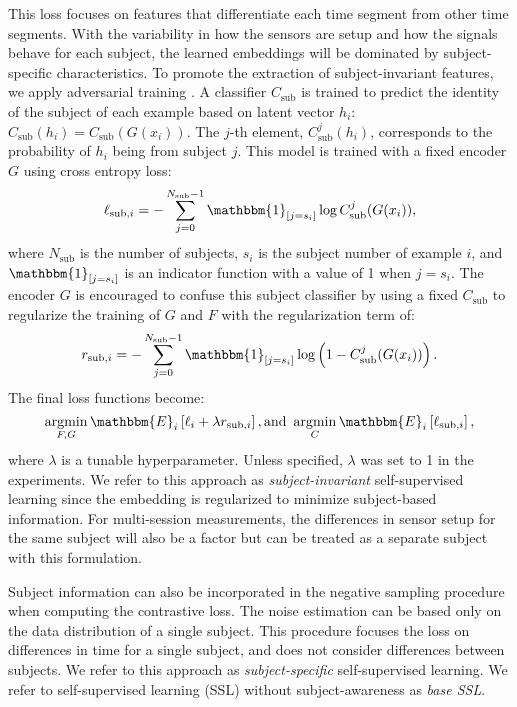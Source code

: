 \documentclass{article}
\DeclareMathOperator*{\argmin}{argmin}
\begin{document}
This loss focuses on features that differentiate each time segment from other
time segments. With the variability in how the sensors are setup and how the
signals behave for each subject, the learned embeddings will be dominated by
subject-specific characteristics. To promote the extraction of subject-invariant
features, we apply adversarial training \cite{goodfellow_generative_2014,
xie_controllable_2017}. A classifier $C_\textrm{sub}$ is trained to predict the
identity of the subject of each example based on latent vector $h_i$:
$C_\textrm{sub}(h_i) = C_\textrm{sub}(G(x_i))$. The $j$-th element,
$C^j_\textrm{sub}(h_i)$, corresponds to the probability of $h_i$ being from
subject $j$. This model is trained with a fixed encoder $G$ using cross entropy
loss:
\begin{equation}
  \ell_{\textrm{sub},i} = -\sum_{j=0}^{N_\textrm{sub}-1} \mathbbm{1}_{[j = s_i]} \log C^j_\textrm{sub}(G(x_i)),
\end{equation}
where $N_\textrm{sub}$ is the number of subjects, $s_i$ is the subject number of
example $i$, and $\mathbbm{1}_{[j = s_i]}$ is an indicator function with a value
of 1 when $j = s_i$. The encoder $G$ is encouraged to confuse this subject
classifier by using a fixed $C_\textrm{sub}$ to regularize the training of $G$
and $F$ with the regularization term of:
\begin{equation}
  r_{\textrm{sub}, i} = -\sum_{j=0}^{N_\textrm{sub}-1} \mathbbm{1}_{[j = s_i]} \log \left(1 - C^j_\textrm{sub}(G(x_i)) \right).
\end{equation}
The final loss functions become:
\begin{equation}
  \argmin_{F, G} \mathbbm{E}_i\left[ \ell_i + \lambda r_{\textrm{sub}, i} \right], \textrm{and } \argmin_{C} \mathbbm{E}_i\left[ \ell_{\textrm{sub},i} \right],
  \label{eq:loss:adv}
\end{equation}
where $\lambda$ is a tunable hyperparameter. Unless specified, $\lambda$ was set
to 1 in the experiments. We refer to this approach as \textit{subject-invariant}
self-supervised learning since the embedding is regularized to minimize
subject-based information. For multi-session measurements, the differences in
sensor setup for the same subject will also be a factor but can be treated as a
separate subject with this formulation.

Subject information can also be incorporated in the negative sampling procedure
when computing the contrastive loss. The noise estimation can be based only on
the data distribution of a single subject. This procedure focuses the loss on
differences in time for a single subject, and does not consider differences
between subjects. We refer to this approach as \textit{subject-specific}
self-supervised learning. We refer to self-supervised learning (SSL) without
subject-awareness as \textit{base SSL}.
\end{document}
